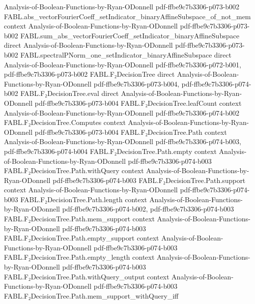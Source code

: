 \begin{theorem}
  {Analysis-of-Boolean-Functions-by-Ryan-ODonnell}
  {pdf-ffbe9c7b3306-p073-b002}
\proofstep
  {FABL.abs_vectorFourierCoeff_setIndicator_binaryAffineSubspace_of_not_mem}
  {context}
  {Analysis-of-Boolean-Functions-by-Ryan-ODonnell}
  {pdf-ffbe9c7b3306-p073-b002}
\proofstep
  {FABL.sum_abs_vectorFourierCoeff_setIndicator_binaryAffineSubspace}
  {direct}
  {Analysis-of-Boolean-Functions-by-Ryan-ODonnell}
  {pdf-ffbe9c7b3306-p073-b002}
\proofstep
  {FABL.spectralPNorm_one_setIndicator_binaryAffineSubspace}
  {direct}
  {Analysis-of-Boolean-Functions-by-Ryan-ODonnell}
  {pdf-ffbe9c7b3306-p072-b001,
    pdf-ffbe9c7b3306-p073-b002}
\proofstep
  {FABL.F₂DecisionTree}
  {direct}
  {Analysis-of-Boolean-Functions-by-Ryan-ODonnell}
  {pdf-ffbe9c7b3306-p073-b004,
    pdf-ffbe9c7b3306-p074-b002}
\proofstep
  {FABL.F₂DecisionTree.eval}
  {direct}
  {Analysis-of-Boolean-Functions-by-Ryan-ODonnell}
  {pdf-ffbe9c7b3306-p073-b004}
\proofstep
  {FABL.F₂DecisionTree.leafCount}
  {context}
  {Analysis-of-Boolean-Functions-by-Ryan-ODonnell}
  {pdf-ffbe9c7b3306-p074-b002}
\proofstep
  {FABL.F₂DecisionTree.Computes}
  {context}
  {Analysis-of-Boolean-Functions-by-Ryan-ODonnell}
  {pdf-ffbe9c7b3306-p073-b004}
\proofstep
  {FABL.F₂DecisionTree.Path}
  {context}
  {Analysis-of-Boolean-Functions-by-Ryan-ODonnell}
  {pdf-ffbe9c7b3306-p074-b003,
    pdf-ffbe9c7b3306-p074-b004}
\proofstep
  {FABL.F₂DecisionTree.Path.empty}
  {context}
  {Analysis-of-Boolean-Functions-by-Ryan-ODonnell}
  {pdf-ffbe9c7b3306-p074-b003}
\proofstep
  {FABL.F₂DecisionTree.Path.withQuery}
  {context}
  {Analysis-of-Boolean-Functions-by-Ryan-ODonnell}
  {pdf-ffbe9c7b3306-p074-b003}
\proofstep
  {FABL.F₂DecisionTree.Path.support}
  {context}
  {Analysis-of-Boolean-Functions-by-Ryan-ODonnell}
  {pdf-ffbe9c7b3306-p074-b003}
\proofstep
  {FABL.F₂DecisionTree.Path.length}
  {context}
  {Analysis-of-Boolean-Functions-by-Ryan-ODonnell}
  {pdf-ffbe9c7b3306-p074-b002,
    pdf-ffbe9c7b3306-p074-b003}
\proofstep
  {FABL.F₂DecisionTree.Path.mem_support}
  {context}
  {Analysis-of-Boolean-Functions-by-Ryan-ODonnell}
  {pdf-ffbe9c7b3306-p074-b003}
\proofstep
  {FABL.F₂DecisionTree.Path.empty_support}
  {context}
  {Analysis-of-Boolean-Functions-by-Ryan-ODonnell}
  {pdf-ffbe9c7b3306-p074-b003}
\proofstep
  {FABL.F₂DecisionTree.Path.empty_length}
  {context}
  {Analysis-of-Boolean-Functions-by-Ryan-ODonnell}
  {pdf-ffbe9c7b3306-p074-b003}
\proofstep
  {FABL.F₂DecisionTree.Path.withQuery_output}
  {context}
  {Analysis-of-Boolean-Functions-by-Ryan-ODonnell}
  {pdf-ffbe9c7b3306-p074-b003}
\proofstep
  {FABL.F₂DecisionTree.Path.mem_support_withQuery_iff}

\end{theorem}
